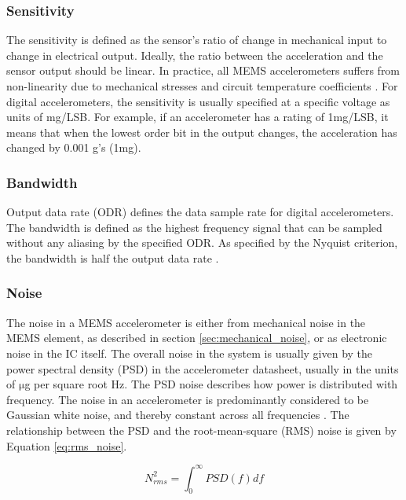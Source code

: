 \subsubsection{Sensitivity}
The sensitivity is defined as the sensor's ratio of change in mechanical input to change in electrical output. Ideally, the ratio between the acceleration and the sensor output should be linear. In practice, all MEMS accelerometers suffers from non-linearity due to mechanical stresses and circuit temperature coefficients  \cite{analog_accel_guide}. For digital accelerometers, the sensitivity is usually specified at a specific voltage as units of mg/LSB. For example, if an accelerometer has a rating of 1mg/LSB, it means that when the lowest order bit in the output changes, the acceleration has changed by 0.001 g's (1mg).

\subsubsection{Bandwidth}

Output data rate (ODR) defines the data sample rate for digital accelerometers. The bandwidth is defined as the highest frequency signal that can be sampled without any aliasing by the specified ODR. As specified by the Nyquist criterion, the bandwidth is half the output data rate \cite{analog_accel_guide}. 

\subsubsection{Noise}

The noise in a MEMS accelerometer is either from mechanical noise in the MEMS element, as described in section \ref{sec:mechanical_noise}, or as electronic noise in the IC itself. The overall noise in the system is usually given by the power spectral density (PSD) in the accelerometer datasheet, usually in the units of $\si{\micro}$g per square root Hz. The PSD noise describes how power is distributed with frequency. The noise in an accelerometer is predominantly considered to be Gaussian white noise, and thereby constant across all frequencies \cite{freescale_accel_guide}. The relationship between the PSD and the root-mean-square (RMS) noise is given by Equation \ref{eq:rms_noise}.

\begin{equation}
N^{2}_{rms}=\int_0^\infty{PSD(f)df}
\label{eq:rms_noise}
\end{equation}

